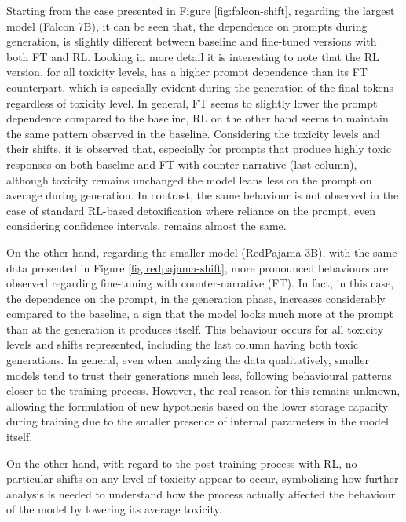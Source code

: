 Starting from the case presented in Figure \ref{fig:falcon-shift}, regarding the largest model (Falcon 7B), it can be seen that, the dependence on prompts during generation, is slightly different between baseline and fine-tuned versions with both FT and RL. Looking in more detail it is interesting to note that the RL version, for all toxicity levels, has a higher prompt dependence than its FT counterpart, which is especially evident during the generation of the final tokens regardless of toxicity level. In general, FT seems to slightly lower the prompt dependence compared to the baseline, RL on the other hand seems to maintain the same pattern observed in the baseline. Considering the toxicity levels and their shifts, it is observed that, especially for prompts that produce highly toxic responses on both baseline and FT with counter-narrative (last column), although toxicity remains unchanged the model leans less on the prompt on average during generation. In contrast, the same behaviour is not observed in the case of standard RL-based detoxification where reliance on the prompt, even considering confidence intervals, remains almost the same.

On the other hand, regarding the smaller model (RedPajama 3B), with the same data presented in Figure \ref{fig:redpajama-shift}, more pronounced behaviours are observed regarding fine-tuning with counter-narrative (FT). In fact, in this case, the dependence on the prompt, in the generation phase, increases considerably compared to the baseline, a sign that the model looks much more at the prompt than at the generation it produces itself. This behaviour occurs for all toxicity levels and shifts represented, including the last column having both toxic generations. In general, even when analyzing the data qualitatively, smaller models tend to trust their generations much less, following behavioural patterns closer to the training process. However, the real reason for this remains unknown, allowing the formulation of new hypothesis based on the lower storage capacity during training due to the smaller presence of internal parameters in the model itself.

On the other hand, with regard to the post-training process with RL, no particular shifts on any level of toxicity appear to occur, symbolizing how further analysis is needed to understand how the process actually affected the behaviour of the model by lowering its average toxicity.




